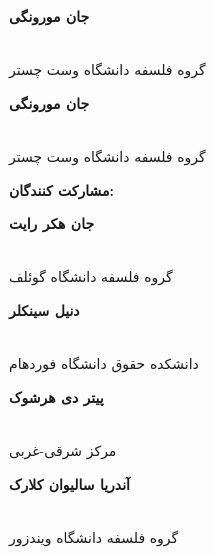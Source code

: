\documentclass[12pt,oneside]{book}
\begin{document}
\begin{multicols}{2}
        \begin{flushright}
            \begin{large}
                \textbf{جان مورونگی}
            \end{large}
            \\
            گروه فلسفه دانشگاه وست چستر
        \end{flushright}

        \begin{flushright}
            \begin{large}
                \textbf{جان مورونگی}
            \end{large}
            \\
            گروه فلسفه دانشگاه وست چستر
        \end{flushright}

        \columnbreak

        \begin{flushright}
            \begin{Large}
                \textbf{مشارکت کنندگان:}
            \end{Large}
        \end{flushright}

        \begin{flushright}
            \begin{large}
                \textbf{جان هکر رایت}
            \end{large}
            \\
            گروه فلسفه دانشگاه گوئلف
        \end{flushright}

        \begin{flushright}
            \begin{large}
                \textbf{دنیل سینکلر}
            \end{large}
            \\
            دانشکده حقوق دانشگاه فوردهام
        \end{flushright}

        \begin{flushright}
            \begin{large}
                \textbf{پیتر دی هرشوک}
            \end{large}
            \\
            مرکز شرقی-غربی
        \end{flushright}

        \begin{flushright}
            \begin{large}
                \textbf{آندریا سالیوان کلارک}
            \end{large}
            \\
            گروه فلسفه دانشگاه ویندزور
        \end{flushright}

    \end{multicols}
\end{document}
